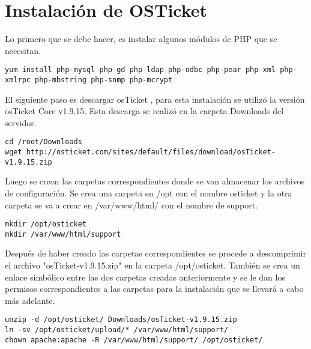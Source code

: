 \section{Instalación de OSTicket}
Lo primero que se debe hacer, es instalar algunos módulos de PHP que se necesitan.
\begin{lstlisting} 
yum install php-mysql php-gd php-ldap php-odbc php-pear php-xml php-xmlrpc php-mbstring php-snmp php-mcrypt
\end{lstlisting}
El siguiente paso es descargar osTicket \cite{osticket}, para esta instalación se utilizó la versión osTicket Core v1.9.15. Esta descarga se realizó en la carpeta Downloads del servidor.  
\begin{lstlisting} 
cd /root/Downloads
wget http://osticket.com/sites/default/files/download/osTicket-v1.9.15.zip
\end{lstlisting}
Luego se crean las carpetas correspondientes donde se van almacenar los archivos de configuración. Se crea una carpeta en /opt con el nombre osticket y la otra carpeta se va a crear en /var/www/html/ con el nombre de support.
\begin{lstlisting} 
mkdir /opt/osticket
mkdir /var/www/html/support
\end{lstlisting}
Después de haber creado las carpetas correspondientes se procede a descomprimir el archivo "osTicket-v1.9.15.zip" en la carpeta /opt/osticket. También se crea un enlace simbólico entre las dos carpetas creadas anteriormente y se le dan los permisos correspondientes a las carpetas para la instalación que se llevará a cabo más adelante. 
\begin{lstlisting} 
unzip -d /opt/osticket/ Downloads/osTicket-v1.9.15.zip
ln -sv /opt/osticket/upload/* /var/www/html/support/
chown apache:apache -R /var/www/html/support/ /opt/osticket/
\end{lstlisting}
